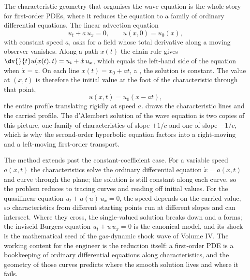 The characteristic geometry that organises the wave equation is
the whole story for first-order PDEs, where it reduces the equation
to a family of ordinary differential equations. The linear
advection equation
\[
u_{t} + a\, u_{x} = 0, \qquad u(x, 0) = u_{0}(x),
\]
with constant speed $a$, asks for a field whose total derivative
along a moving observer vanishes. Along a path $x(t)$ the chain
rule gives $\dv{}{t} u(x(t), t) = u_{t} + \dot{x}\, u_{x}$, which
equals the left-hand side of the equation when $\dot{x} = a$. On
each line $x(t) = x_{0} + a t$, a , the
solution is constant. The value at $(x, t)$ is therefore the
initial value at the foot of the characteristic through that point,
\[
u(x, t) = u_{0}(x - a t),
\]
the entire profile translating rigidly at speed $a$.
 draws the characteristic
lines and the carried profile. The d'Alembert solution of the wave
equation is two copies of this picture, one family of
characteristics of slope $+1/c$ and one of slope $-1/c$, which is
why the second-order hyperbolic equation factors into a
right-moving and a left-moving first-order transport.



The method extends past the constant-coefficient case. For a
variable speed $a(x, t)$ the characteristics solve the ordinary
differential equation $\dot{x} = a(x, t)$ and curve through the
plane; the solution is still constant along each curve, so the
problem reduces to tracing curves and reading off initial values.
For the quasilinear equation $u_{t} + a(u)\, u_{x} = 0$, the speed
depends on the carried value, so characteristics from different
starting points run at different slopes and can intersect. Where
they cross, the single-valued solution breaks down and a
 forms; the inviscid Burgers equation $u_{t} +
u\, u_{x} = 0$ is the canonical model, and its shock is the
mathematical seed of the gas-dynamic shock wave of Volume IV. The
working content for the engineer is the reduction itself: a
first-order PDE is a bookkeeping of ordinary differential equations
along characteristics, and the geometry of those curves predicts
where the smooth solution lives and where it fails.

